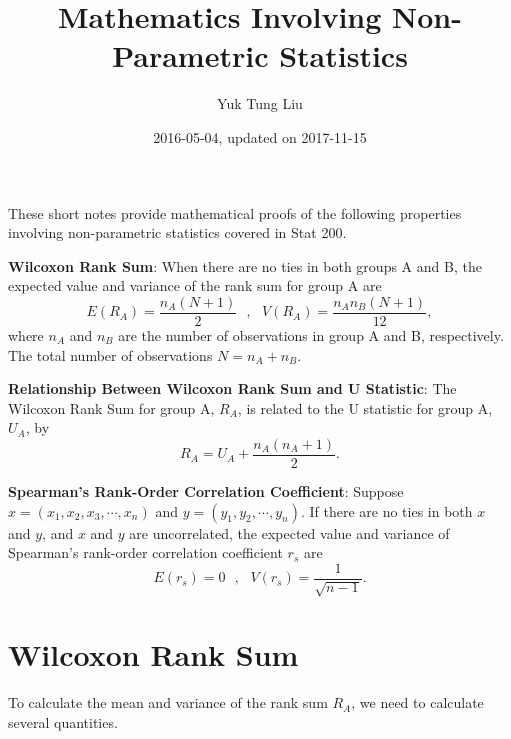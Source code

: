 \documentclass[11pt]{article}
\newcommand{\beq}{\begin{equation}}
\newcommand{\eeq}{\end{equation}}
\numberwithin{equation}{section}
\begin{document}
\title{Mathematics Involving Non-Parametric Statistics}
\date{2016-05-04, updated on 2017-11-15}
\author{Yuk Tung Liu}
\maketitle

\bigskip

These short notes provide mathematical proofs of the following properties involving non-parametric 
statistics covered in Stat 200. 

{\bf Wilcoxon Rank Sum}: When there are no ties in both groups A and B, the expected value and 
variance of the rank sum for group A are 
\beq
  E(R_A) = \frac{n_A (N+1)}{2} \ \ \ , \ \ \ V(R_A) = \frac{n_A n_B (N+1)}{12} ,
\eeq
where $n_A$ and $n_B$ are the number of observations in group A and B, respectively. The total 
number of observations $N=n_A+n_B$. 
 
{\bf Relationship Between Wilcoxon Rank Sum and U Statistic}: The Wilcoxon Rank Sum for group A, 
$R_A$, is related to the U statistic for group A, $U_A$, by 
\beq
  R_A = U_A + \frac{n_A(n_A+1)}{2} .
\eeq

{\bf Spearman's Rank-Order Correlation Coefficient}: Suppose $x=(x_1, x_2, x_3, \cdots, x_n)$ and 
$y=(y_1,y_2,\cdots, y_n)$. If there are no ties in both $x$ and $y$, and $x$ and 
$y$ are uncorrelated, the expected value and variance of Spearman's rank-order correlation coefficient 
$r_s$ are 
\beq
  E(r_s) = 0 \ \ \ , \ \ \ V(r_s) = \frac{1}{\sqrt{n-1}} .
\eeq

\section{Wilcoxon Rank Sum}

To calculate the mean and variance of the rank sum $R_A$, we need to calculate several 
quantities.
\end{document}
